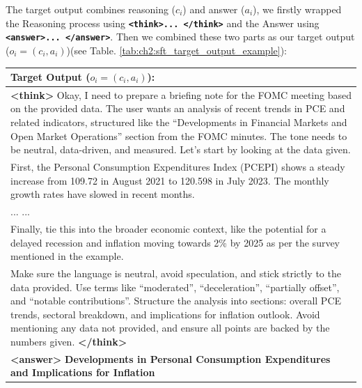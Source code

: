 The target output combines reasoning ($c_i$) and answer ($a_i$), we firstly wrapped the Reasoning process using \textbf{\texttt{\textless think\textgreater ... \textless /think\textgreater}} and the Answer using \textbf{\texttt{\textless answer\textgreater ... \textless /answer\textgreater}}. Then we combined these two parts as our target output ($o_i = (c_i, a_i)$)(see Table. \ref{tab:ch2:sft_target_output_example}):



\begin{table}[h]
    \centering
    \footnotesize
    \begin{tabular}{p{}}
    \toprule
    \textbf{Target Output ($o_i = (c_i, a_i)$):} \\
    \midrule
    \textbf{\textless think\textgreater} Okay, I need to prepare a briefing note for the FOMC meeting based on the provided data. The user wants an analysis of recent trends in PCE and related indicators, structured like the \textquotedblleft Developments in Financial Markets and Open Market Operations\textquotedblright{} section from the FOMC minutes. The tone needs to be neutral, data-driven, and measured. Let's start by looking at the data given. \\

    First, the Personal Consumption Expenditures Index (PCEPI) shows a steady increase from 109.72 in August 2021 to 120.598 in July 2023. The monthly growth rates have slowed in recent months. \\

    ... ... \\

    Finally, tie this into the broader economic context, like the potential for a delayed recession and inflation moving towards 2\% by 2025 as per the survey mentioned in the example. \\

    Make sure the language is neutral, avoid speculation, and stick strictly to the data provided. Use terms like ``moderated'', ``deceleration'', ``partially offset'', and ``notable contributions''. Structure the analysis into sections: overall PCE trends, sectoral breakdown, and implications for inflation outlook. Avoid mentioning any data not provided, and ensure all points are backed by the numbers given. \textbf{\textless /think\textgreater} \\[1ex]

    \textbf{\textless answer\textgreater} \textbf{Developments in Personal Consumption Expenditures and Implications for Inflation} \\


\end{tabular}
\end{table}
